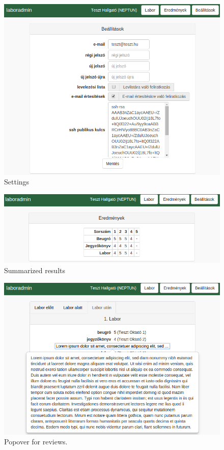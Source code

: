\begin{figure}[!ht]
	\includegraphics[width=\textwidth]{figures/design/beallitasok.png}
	\caption{Settings}
	\label{fig:settings}
\end{figure}

\begin{figure}[!ht]
	\includegraphics[width=\textwidth]{figures/design/eredmenyek.png}
	\caption{Summarized results}
	\label{fig:results}
\end{figure}

\begin{figure}[!ht]
	\includegraphics[width=\textwidth]{figures/design/popup.png}
	\caption{Popover for reviews.}
	\label{fig:popup}
\end{figure}

